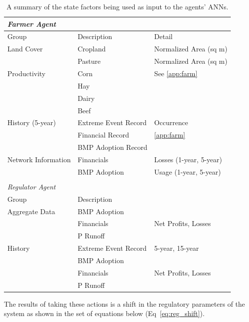 \begin{table}[p]
    \centering
    \caption{A summary of the state factors being used as input to the
    agents' ANNs.}
    \label{tab:farm_agents_states}
    \begin{tabularx}{\linewidth}{XXl}
        \emph{Farmer Agent} \\
        \hline\hline
        Group & Description & Detail \\
        \hline
        Land Cover & Cropland & Normalized Area (sq m) \\
        & Pasture & Normalized Area (sq m) \\
        Productivity & Corn & See \ref{app:farm} \\
        & Hay \\
        & Dairy \\
        & Beef \\
        History (5-year) & Extreme Event Record & Occurrence \\
        & Financial Record & \ref{app:farm} \\
        & BMP Adoption Record & \\
        Network Information & Financials & Losses (1-year, 5-year) \\
        & BMP Adoption & Usage (1-year, 5-year) \\
        \hline \\[1.0em]
        \emph{Regulator Agent} \\
        \hline
        \hline
        Group & Description & \\
        \hline
        Aggregate Data & \multicolumn{2}{l}{BMP Adoption} \\
        & Financials & Net Profits, Losses \\
        & \multicolumn{2}{l}{P Runoff} \\
        History & Extreme Event Record & 5-year, 15-year \\
        & \multicolumn{2}{l}{BMP Adoption} \\
        & Financials & Net Profits, Losses \\
        & \multicolumn{2}{l}{P Runoff} \\
        \hline
    \end{tabularx}
\end{table}


The results of taking these actions is a shift in the regulatory
parameters of the system as shown in the set of equations below
(Eq~\ref{eq:reg_shift}).

